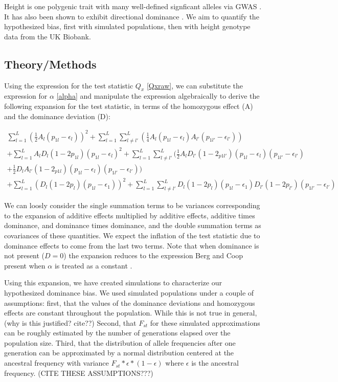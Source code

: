 \documentclass[a4paper,11pt]{article}
\newcommand{\jb}[1]{{\color{blue} (#1)} }
\begin{document}
Height is one polygenic trait with many well-defined signficant
alleles via GWAS \cite{heightselection}. It has also been shown to exhibit
directional dominance \cite{heightdirectdom}. We aim to quantify the
hypothesized bias, first with simulated populations, then with height genotype data from the UK Biobank.



\subsection*{Theory/Methods}

Using the expression for the test statistic $Q_x$ \eqref{Qxraw}, we
can substitute the expression for $\alpha$ \eqref{alpha} and manipulate
the expression algebraically to derive the following expansion for the
test statistic, in terms of the homozygous effect (A)  and the dominance
deviation (D):

\begin{equation}
  \begin{split}
  \sum^L_{l=1}( \frac{1}{2}A_l(p_{1l}-\epsilon_l))^2+\sum^L_{l=1}\sum^L_{
    l \neq l'}(\frac{1}{4}A_l(p_{1l}-\epsilon_{l})A_{l'}(p_{1l'}-\epsilon_{l'}))
  \\
  +\sum^L_{l=1}A_lD_l(1-2p_{1l})(p_{1l}-\epsilon_l)^2 +
  \sum^L_{l=1}\sum^L_{l \neq
    l'}(\frac{1}{2}A_lD_{l'}(1-2_{p1l'})(p_{1l}-\epsilon_l)(p_{1l'}-\epsilon_{l'}) \\
  + \frac{1}{2}D_lA_{l'}(1-2_{p1l})(p_{1l}-\epsilon_l)(p_{1l'}-\epsilon_{l'})) \\
   + \sum^L_{l=1} (D_l(1-2p_l)(p_{1l}-\epsilon_{1}))^2
   + \sum^L_{l=1}\sum^L_{l \neq
     l'}D_{l}(1-2p_{l})(p_{1l}-\epsilon_{1})D_{l'}(1-2p_{l'})(p_{1l'}-\epsilon_{l'}) \label{expansion}
  \end{split}
\end{equation}

We can loosly consider the single summation terms to be variances
corresponding to the expansion of additive effects multiplied by
additive effects, additive times dominance, and dominance times
dominance, and the double summation terms as covariances of these
quantities. We expect the inflation of the test statistic due to
dominance effects to come from the last two terms. Note that when
dominance is not present ($D=0$) the expansion reduces to the
expression Berg and Coop present when $\alpha$ is treated as a constant
\cite{berg}.

Using this expansion, we have created simulations to characterize our
hypothesized dominance bias. We used simulated populations
under a couple of assumptions: first, that the values of the dominance
deviations and homozygous effects are constant throughout the
population. While this is not true in general, \jb{why is this
  justified? cite??} Second, that $F_{st}$ for these simulated approximations
can be roughly estimated by the number of generations elapsed over the
population size. Third, that the distribution of allele frequencies after
one generation can be approximated by a normal distribution centered
at the ancestral frequency with variance
$F_{st}*\epsilon*(1-\epsilon)$ where $\epsilon$ is the ancestral
frequency. \jb{CITE THESE ASSUMPTIONS???}
\end{document}
